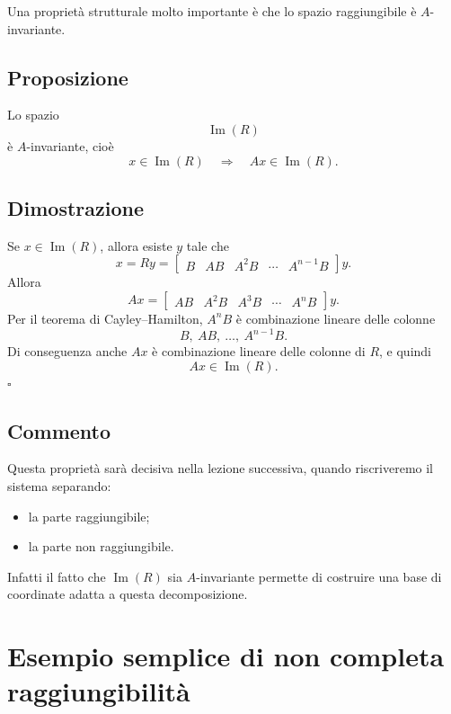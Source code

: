 Una proprietà strutturale molto importante è che lo spazio raggiungibile è \(A\)-invariante.

\subsection*{Proposizione}
Lo spazio
\[
\operatorname{Im}(R)
\]
è \(A\)-invariante, cioè
\[
x\in\operatorname{Im}(R)\quad\Longrightarrow\quad Ax\in\operatorname{Im}(R).
\]

\subsection*{Dimostrazione}
Se \(x\in\operatorname{Im}(R)\), allora esiste \(y\) tale che
\[
x=Ry=
\begin{bmatrix}
B & AB & A^2B & \cdots & A^{n-1}B
\end{bmatrix}y.
\]
Allora
\[
Ax=
\begin{bmatrix}
AB & A^2B & A^3B & \cdots & A^nB
\end{bmatrix}y.
\]
Per il teorema di Cayley--Hamilton, \(A^nB\) è combinazione lineare delle colonne
\[
B,\ AB,\ \dots,\ A^{n-1}B.
\]
Di conseguenza anche \(Ax\) è combinazione lineare delle colonne di \(R\), e quindi
\[
Ax\in\operatorname{Im}(R).
\]
\hfill\(\square\)

\subsection{Commento}

Questa proprietà sarà decisiva nella lezione successiva, quando riscriveremo il sistema separando:
\begin{itemize}
    \item la parte raggiungibile;
    \item la parte non raggiungibile.
\end{itemize}

Infatti il fatto che \(\operatorname{Im}(R)\) sia \(A\)-invariante permette di costruire una base di coordinate adatta a questa decomposizione.

\section{Esempio semplice di non completa raggiungibilità}

